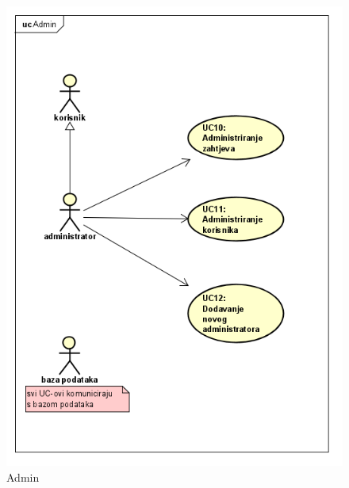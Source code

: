 					\begin{figure}[H]
					\includegraphics[scale=1.0]{slike/admin.png} %
					\centering
					\caption{Admin}
				\end{figure}
				
